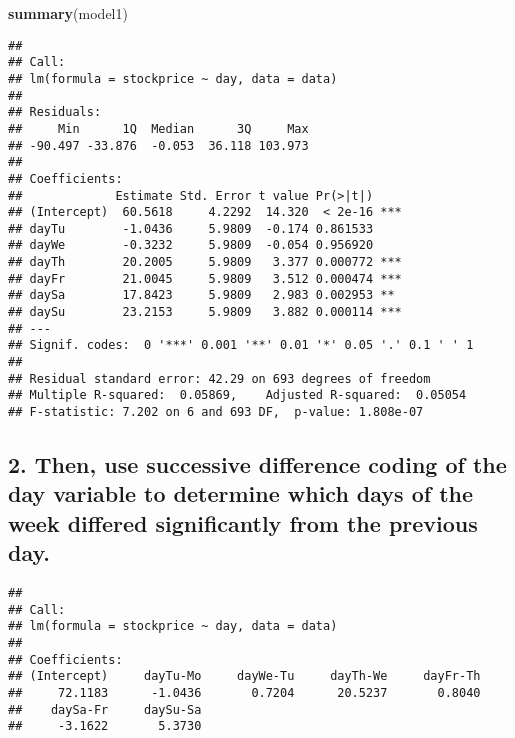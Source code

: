 \documentclass[]{article}
\newenvironment{Shaded}{\begin{snugshade}}{\end{snugshade}}
\newcommand{\KeywordTok}[1]{\textcolor[rgb]{0.13,0.29,0.53}{\textbf{#1}}}
\newcommand{\DataTypeTok}[1]{\textcolor[rgb]{0.13,0.29,0.53}{#1}}
\newcommand{\StringTok}[1]{\textcolor[rgb]{0.31,0.60,0.02}{#1}}
\newcommand{\CommentTok}[1]{\textcolor[rgb]{0.56,0.35,0.01}{\textit{#1}}}
\newcommand{\OperatorTok}[1]{\textcolor[rgb]{0.81,0.36,0.00}{\textbf{#1}}}
\newcommand{\NormalTok}[1]{#1}
\begin{document}
\begin{Shaded}
\begin{Highlighting}[]
\KeywordTok{summary}\NormalTok{(model1)}
\end{Highlighting}
\end{Shaded}

\begin{verbatim}
## 
## Call:
## lm(formula = stockprice ~ day, data = data)
## 
## Residuals:
##     Min      1Q  Median      3Q     Max 
## -90.497 -33.876  -0.053  36.118 103.973 
## 
## Coefficients:
##             Estimate Std. Error t value Pr(>|t|)    
## (Intercept)  60.5618     4.2292  14.320  < 2e-16 ***
## dayTu        -1.0436     5.9809  -0.174 0.861533    
## dayWe        -0.3232     5.9809  -0.054 0.956920    
## dayTh        20.2005     5.9809   3.377 0.000772 ***
## dayFr        21.0045     5.9809   3.512 0.000474 ***
## daySa        17.8423     5.9809   2.983 0.002953 ** 
## daySu        23.2153     5.9809   3.882 0.000114 ***
## ---
## Signif. codes:  0 '***' 0.001 '**' 0.01 '*' 0.05 '.' 0.1 ' ' 1
## 
## Residual standard error: 42.29 on 693 degrees of freedom
## Multiple R-squared:  0.05869,    Adjusted R-squared:  0.05054 
## F-statistic: 7.202 on 6 and 693 DF,  p-value: 1.808e-07
\end{verbatim}

\subsection{2. Then, use successive difference coding of the day
variable to determine which days of the week differed significantly from
the previous
day.}\label{then-use-successive-difference-coding-of-the-day-variable-to-determine-which-days-of-the-week-differed-significantly-from-the-previous-day.}

\begin{Shaded}
\end{Shaded}

\begin{verbatim}
## 
## Call:
## lm(formula = stockprice ~ day, data = data)
## 
## Coefficients:
## (Intercept)     dayTu-Mo     dayWe-Tu     dayTh-We     dayFr-Th  
##     72.1183      -1.0436       0.7204      20.5237       0.8040  
##    daySa-Fr     daySu-Sa  
##     -3.1622       5.3730
\end{verbatim}
\end{document}
